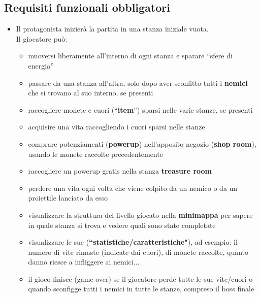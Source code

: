 \documentclass[a4paper,12pt]{report}
\begin{document}
\subsection*{Requisiti funzionali obbligatori}
\begin{itemize}
    \item Il protagonista inizierà la partita in una stanza iniziale vuota.
    \\Il giocatore può:
    \begin{itemize}
        \item muoversi liberamente all'interno di ogni stanza e sparare ``sfere di energia''
        \item passare da una stanza all'altra, solo dopo aver sconfitto tutti i \textbf{nemici} che si trovano al suo interno, se presenti
        \item raccogliere monete e cuori (``\textbf{item}'') sparsi nelle varie stanze, se presenti
        \item acquisire una vita raccogliendo i cuori sparsi nelle stanze
        \item comprare potenziamenti (\textbf{powerup}) nell'apposito negozio (\textbf{shop room}), usando le monete raccolte precedentemente
        \item raccogliere un powerup gratis nella stanza \textbf{treasure room}
        \item perdere una vita ogni volta che viene colpito da un nemico o da un proiettile lanciato da esso
        \item visualizzare la struttura del livello giocato nella \textbf{minimappa} per sapere in quale stanza si trova e vedere quali sono state completate
        \item visualizzare le sue (\textbf{``statistiche/caratteristiche"}), ad esempio: il numero di vite rimaste (indicate dai cuori), di monete raccolte, quanto danno riesce a infliggere ai nemici...
        \item il gioco finisce (game over) se il giocatore perde tutte le sue vite/cuori o quando sconfigge tutti i nemici in tutte le stanze, compreso il boss finale
    \end{itemize}


\end{itemize}
\end{document}
